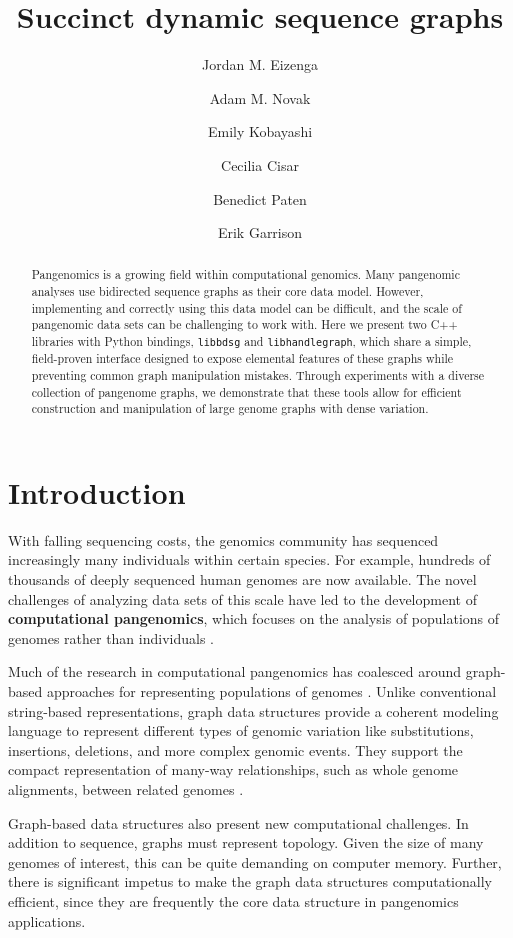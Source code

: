 \documentclass{article}
\title{Succinct dynamic sequence graphs} %
\author{Jordan M. Eizenga \and Adam M. Novak \and Emily Kobayashi \and Cecilia Cisar \and Benedict Paten \and Erik Garrison}
\newcommand{\vocab}{\textbf}
\begin{document}
\maketitle

\begin{abstract}

Pangenomics is a growing field within computational genomics.
Many pangenomic analyses use bidirected sequence graphs as their core data model.
However, implementing and correctly using this data model can be difficult, and the scale of pangenomic data sets can be challenging to work with.
Here we present two C++ libraries with Python bindings, \texttt{libbdsg} and \texttt{libhandlegraph}, which share a simple, field-proven interface designed to expose elemental features of these graphs while preventing common graph manipulation mistakes.
Through experiments with a diverse collection of pangenome graphs, we demonstrate that these tools allow for efficient construction and manipulation of large genome graphs with dense variation.

\end{abstract}

\section{Introduction}

With falling sequencing costs, the genomics community has sequenced increasingly many individuals within certain species.
For example, hundreds of thousands of deeply sequenced human genomes are now available.
The novel challenges of analyzing data sets of this scale have led to the development of \vocab{computational pangenomics}, which focuses on the analysis of populations of genomes rather than individuals \cite{computational2016computational}.

Much of the research in computational pangenomics has coalesced around graph-based approaches for representing populations of genomes \cite{Paten_2017}.
Unlike conventional string-based representations, graph data structures provide a coherent modeling language to represent different types of genomic variation like substitutions, insertions, deletions, and more complex genomic events.
They support the compact representation of many-way relationships, such as whole genome alignments, between related genomes \cite{kehr2014genome}.

Graph-based data structures also present new computational challenges.
In addition to sequence, graphs must represent topology.
Given the size of many genomes of interest, this can be quite demanding on computer memory.
Further, there is significant impetus to make the graph data structures computationally efficient, since they are frequently the core data structure in pangenomics applications.
\end{document}
